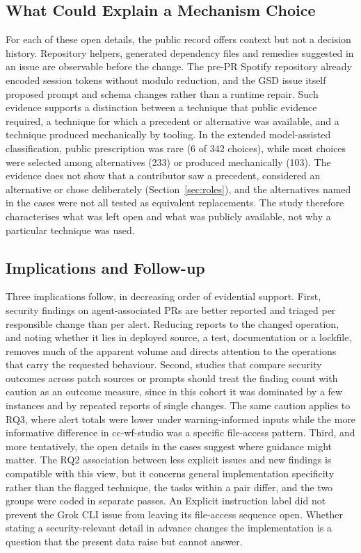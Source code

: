 \documentclass[acmsmall,screen,nonacm]{acmart}
\begin{document}
\subsection{What Could Explain a Mechanism Choice}\label{sec:explain}

For each of these open details, the public record offers context but not a decision history. Repository helpers, generated dependency files and remedies suggested in an issue are observable before the change. The pre-PR Spotify repository already encoded session tokens without modulo reduction, and the GSD issue itself proposed prompt and schema changes rather than a runtime repair. Such evidence supports a distinction between a technique that public evidence required, a technique for which a precedent or alternative was available, and a technique produced mechanically by tooling. In the extended model-assisted classification, public prescription was rare (6 of 342 choices), while most choices were selected among alternatives (233) or produced mechanically (103). The evidence does not show that a contributor saw a precedent, considered an alternative or chose deliberately (Section~\ref{sec:roles}), and the alternatives named in the cases were not all tested as equivalent replacements. The study therefore characterises what was left open and what was publicly available, not why a particular technique was used.

\subsection{Implications and Follow-up}

Three implications follow, in decreasing order of evidential support. First, security findings on agent-associated PRs are better reported and triaged per responsible change than per alert. Reducing reports to the changed operation, and noting whether it lies in deployed source, a test, documentation or a lockfile, removes much of the apparent volume and directs attention to the operations that carry the requested behaviour. Second, studies that compare security outcomes across patch sources or prompts should treat the finding count with caution as an outcome measure, since in this cohort it was dominated by a few instances and by repeated reports of single changes. The same caution applies to RQ3, where alert totals were lower under warning-informed inputs while the more informative difference in cc-wf-studio was a specific file-access pattern. Third, and more tentatively, the open details in the cases suggest where guidance might matter. The RQ2 association between less explicit issues and new findings is compatible with this view, but it concerns general implementation specificity rather than the flagged technique, the tasks within a pair differ, and the two groups were coded in separate passes. An Explicit instruction label did not prevent the Grok CLI issue from leaving its file-access sequence open. Whether stating a security-relevant detail in advance changes the implementation is a question that the present data raise but cannot answer.
\end{document}
